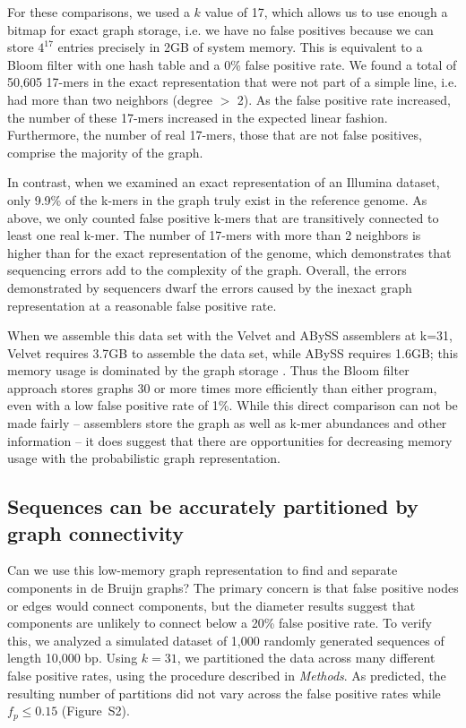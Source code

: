 \documentclass{pnastwo}
\begin{document}
\begin{article}
For these comparisons, we used a $k$ value of 17, which allows us to
use enough a bitmap for exact graph storage, i.e. we have no false
positives because we can store $4^{17}$ entries precisely in 2GB of
system memory. This is equivalent to a Bloom filter with one hash
table and a 0\% false positive rate.  We found a total of 50,605
17-mers in the exact representation that were not part of a simple
line, i.e. had more than two neighbors (degree $>$ 2). As the false
positive rate increased, the number of these 17-mers increased in the
expected linear fashion.
Furthermore, the number of real 17-mers, those that are not false
positives, comprise the majority of the graph.

In contrast, when we examined an exact representation of an Illumina
dataset, only 9.9\% of the k-mers in the graph truly exist in the
reference genome.  As above, we only counted false positive k-mers
that are transitively connected to least one real k-mer. The number of
17-mers with more than 2 neighbors is higher than for the exact
representation of the genome, which demonstrates that sequencing
errors add to the complexity of the graph. Overall, the errors
demonstrated by sequencers dwarf the errors caused by the inexact
graph representation at a reasonable false positive rate.

When we assemble this data set with the Velvet and ABySS assemblers at
k=31, Velvet requires 3.7GB to assemble the data set, while ABySS
requires 1.6GB; this memory usage is dominated by the graph storage
\cite{zerbinothesis}. Thus the Bloom filter approach stores graphs 30
or more times more efficiently than either program, even with a low
false positive rate of 1\%.  While this direct comparison can not be
made fairly -- assemblers store the graph as well as k-mer abundances
and other information -- it does suggest that there are opportunities
for decreasing memory usage with the probabilistic graph representation.

\subsection{Sequences can be accurately partitioned by graph connectivity}


Can we use this low-memory graph representation to find and separate
components in de Bruijn graphs?  The primary concern is that false
positive nodes or edges would connect components, but the diameter
results suggest that components are unlikely to connect below a 20\%
false positive rate.  To verify this, we analyzed a simulated dataset
of 1,000 randomly generated sequences of length 10,000 bp.  Using
$k=31$, we partitioned the data across many different false positive
rates, using the procedure described in \emph{Methods}. As predicted,
the resulting number of partitions did not vary across the false
positive rates while $f_p \le 0.15$ (Figure~S2).


\end{article}
\end{document}
